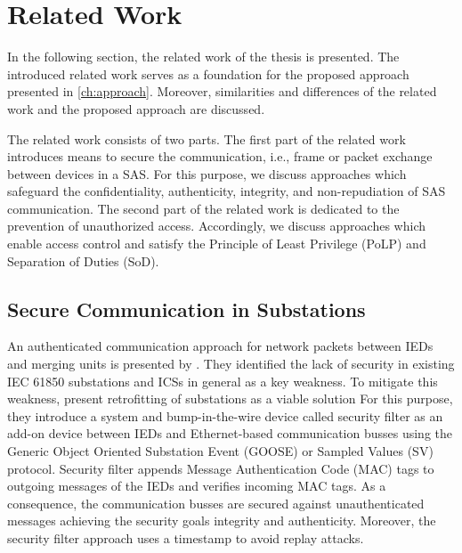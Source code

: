 \chapter{Related Work}
\label{ch:relatedwork}
In the following section, the related work of the thesis is presented.
The introduced related work serves as a foundation for the proposed approach presented in \autoref{ch:approach}.
Moreover, similarities and differences of the related work and the proposed approach are discussed.

The related work consists of two parts.
The first part of the related work introduces means to secure the communication, i.e., frame or packet exchange between devices in a SAS.
For this purpose, we discuss approaches which safeguard the confidentiality, authenticity, integrity, and non-repudiation of SAS communication.
The second part of the related work is dedicated to the prevention of unauthorized access.
Accordingly, we discuss approaches which enable access control and satisfy the Principle of Least Privilege (PoLP) and Separation of Duties (SoD).

\section{Secure Communication in Substations}
An authenticated communication approach for network packets between IEDs and merging units is presented by \citeauthor{Ishchenko2018} \cite{Ishchenko2018}.
They identified the lack of security in existing IEC 61850 substations and ICSs in general as a key weakness.
To mitigate this weakness, \citeauthor{Ishchenko2018} present retrofitting of substations as a viable solution
For this purpose, they introduce a system and bump-in-the-wire device called security filter as an add-on device between IEDs and Ethernet-based communication busses using the Generic Object Oriented Substation Event (GOOSE) or Sampled Values (SV) protocol.
Security filter appends Message Authentication Code (MAC) tags to outgoing messages of the IEDs and verifies incoming MAC tags.
As a consequence, the communication busses are secured against unauthenticated messages achieving the security goals integrity and authenticity.
Moreover, the security filter approach uses a timestamp to avoid replay attacks.

